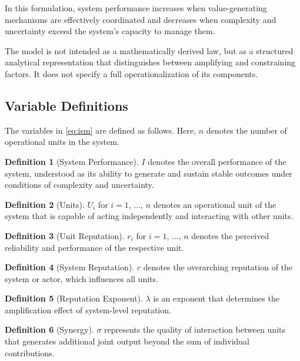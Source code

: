 \documentclass[11pt,a4paper]{article}
\theoremstyle{definition}
\newtheorem{definition}{Definition}[section]
\begin{document}
In this formulation, system performance increases when value-generating mechanisms are effectively coordinated and decreases when complexity and uncertainty exceed the system's capacity to manage them.

The model is not intended as a mathematically derived law, but as a structured analytical representation that distinguishes between amplifying and constraining factors.
It does not specify a full operationalization of its components.


\subsection{Variable Definitions}
\label{subsec:variables}

The variables in \cref{eq:ism} are defined as follows.
Here, $n$ denotes the number of operational units in the system.

\begin{definition}[System Performance]
\label{def:performance}
$I$ denotes the overall performance of the system, understood as its ability to generate and sustain stable outcomes under conditions of complexity and uncertainty.
\end{definition}

\begin{definition}[Units]
\label{def:units}
$U_i$ for $i = 1$, $\dots$, $n$ denotes an operational unit of the system that is capable of acting independently and interacting with other units.
\end{definition}

\begin{definition}[Unit Reputation]
\label{def:unit_reputation}
$r_i$ for $i = 1$, $\dots$, $n$ denotes the perceived reliability and performance of the respective unit.
\end{definition}

\begin{definition}[System Reputation]
\label{def:system_reputation}
$r$ denotes the overarching reputation of the system or actor, which influences all units.
\end{definition}

\begin{definition}[Reputation Exponent]
\label{def:lambda}
$\lambda$ is an exponent that determines the amplification effect of system-level reputation.
\end{definition}

\begin{definition}[Synergy]
\label{def:synergy}
$\sigma$ represents the quality of interaction between units that generates additional joint output beyond the sum of individual contributions.
\end{definition}
\end{document}
